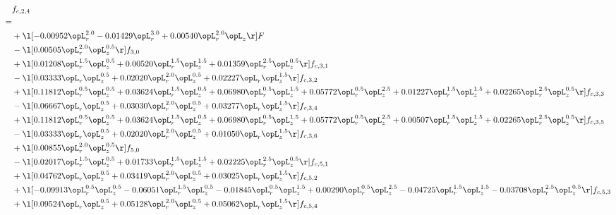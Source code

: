 \begin{alignat}{2} 
\label{eq:f_24_2} 
& f_{c,2,4} \nonumber \\ 
 = \\ 
& + \l[  -0.00952 \opL_r^{2.0}   -0.01429 \opL_r^{3.0} +  0.00540 \opL_r^{2.0} \opL_z  \r] F \nonumber \\ 
& - \l[  0.00505 \opL_r^{2.0} \opL_z^{0.5}  \r] f_{3,0} \nonumber \\ 
& + \l[  0.01208 \opL_r^{1.5} \opL_z^{0.5} +  0.00520 \opL_r^{1.5} \opL_z^{1.5} +  0.01359 \opL_r^{2.5} \opL_z^{0.5}  \r] f_{c,3,1} \nonumber \\ 
& - \l[  0.03333 \opL_r \opL_z^{0.5} +  0.02020 \opL_r^{2.0} \opL_z^{0.5} +  0.02227 \opL_r \opL_z^{1.5}  \r] f_{c,3,2} \nonumber \\ 
& + \l[  0.11812 \opL_r^{0.5} \opL_z^{0.5} +  0.03624 \opL_r^{1.5} \opL_z^{0.5} +  0.06980 \opL_r^{0.5} \opL_z^{1.5} +  0.05772 \opL_r^{0.5} \opL_z^{2.5} +  0.01227 \opL_r^{1.5} \opL_z^{1.5} +  0.02265 \opL_r^{2.5} \opL_z^{0.5}  \r] f_{c,3,3} \nonumber \\ 
& - \l[  0.06667 \opL_r \opL_z^{0.5} +  0.03030 \opL_r^{2.0} \opL_z^{0.5} +  0.03277 \opL_r \opL_z^{1.5}  \r] f_{c,3,4} \nonumber \\ 
& + \l[  0.11812 \opL_r^{0.5} \opL_z^{0.5} +  0.03624 \opL_r^{1.5} \opL_z^{0.5} +  0.06980 \opL_r^{0.5} \opL_z^{1.5} +  0.05772 \opL_r^{0.5} \opL_z^{2.5} +  0.00507 \opL_r^{1.5} \opL_z^{1.5} +  0.02265 \opL_r^{2.5} \opL_z^{0.5}  \r] f_{c,3,5} \nonumber \\ 
& - \l[  0.03333 \opL_r \opL_z^{0.5} +  0.02020 \opL_r^{2.0} \opL_z^{0.5} +  0.01050 \opL_r \opL_z^{1.5}  \r] f_{c,3,6} \nonumber \\ 
& + \l[  0.00855 \opL_r^{2.0} \opL_z^{0.5}  \r] f_{5,0} \nonumber \\ 
& - \l[  0.02017 \opL_r^{1.5} \opL_z^{0.5} +  0.01733 \opL_r^{1.5} \opL_z^{1.5} +  0.02225 \opL_r^{2.5} \opL_z^{0.5}  \r] f_{c,5,1} \nonumber \\ 
& + \l[  0.04762 \opL_r \opL_z^{0.5} +  0.03419 \opL_r^{2.0} \opL_z^{0.5} +  0.03025 \opL_r \opL_z^{1.5}  \r] f_{c,5,2} \nonumber \\ 
& + \l[  -0.09913 \opL_r^{0.5} \opL_z^{0.5}   -0.06051 \opL_r^{1.5} \opL_z^{0.5}   -0.01845 \opL_r^{0.5} \opL_z^{1.5} +  0.00290 \opL_r^{0.5} \opL_z^{2.5}   -0.04725 \opL_r^{1.5} \opL_z^{1.5}   -0.03708 \opL_r^{2.5} \opL_z^{0.5}  \r] f_{c,5,3} \nonumber \\ 
& + \l[  0.09524 \opL_r \opL_z^{0.5} +  0.05128 \opL_r^{2.0} \opL_z^{0.5} +  0.05062 \opL_r \opL_z^{1.5}  \r] f_{c,5,4} \nonumber \\ 

\end{alignat}
